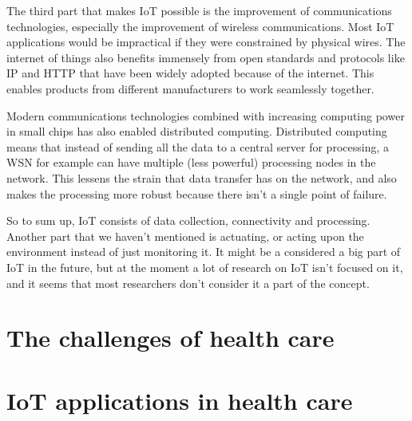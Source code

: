 The third part that makes IoT possible is the improvement of communications
technologies, especially the improvement of wireless communications. Most IoT
applications would be impractical if they were constrained by physical wires.
The internet of things also benefits immensely from open standards and
protocols like IP and HTTP that have been widely adopted because of the
internet. This enables products from different manufacturers to work seamlessly
together.

Modern communications technologies combined with increasing computing power in
small chips has also enabled distributed computing.  Distributed computing
means that instead of sending all the data to a central server for processing,
a WSN for example can have multiple (less powerful) processing nodes in the
network. This lessens the strain that data transfer has on the network, and
also makes the processing more robust because there isn't a single point of
failure.~\cite{Yu2006}

So to sum up, IoT consists of data collection, connectivity and processing.
Another part that we haven't mentioned is actuating, or acting upon the
environment instead of just monitoring it. It might be a considered a big part
of IoT in the future, but at the moment a lot of research on IoT isn't focused
on it, and it seems that most researchers don't consider it a part of the
concept.

\section{The challenges of health care}
\label{sec:health}

\section{IoT applications in health care}
\label{sec:iot-health}
